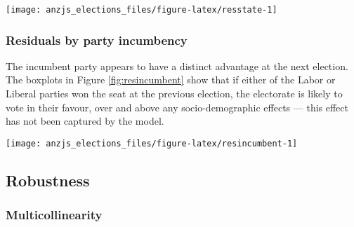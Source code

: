 \documentclass[times, doublespace]{anzsauth}
\let\origfigure\figure
\let\endorigfigure\endfigure
\renewenvironment{figure}[1][2] {
    \expandafter\origfigure\expandafter[htbp]
} {
    \endorigfigure
}
\begin{document}
\begin{figure}[h]

{\centering \texttt{[image: anzjs\_elections\_files/figure-latex/resstate-1]} 

}

\caption{Boxplot of residuals by state with jittered points. States ordered by median residual. A state-specific bias present only in the smaller states appears to have not been captured by the model.}\label{fig:resstate}
\end{figure}

\hypertarget{residuals-by-party-incumbency}{%
\subsubsection*{Residuals by party incumbency}\label{residuals-by-party-incumbency}}

The incumbent party appears to have a distinct advantage at the next election. The boxplots in Figure \ref{fig:resincumbent} show that if either of the Labor or Liberal parties won the seat at the previous election, the electorate is likely to vote in their favour, over and above any socio-demographic effects --- this effect has not been captured by the model.

\begin{figure}[h]

{\centering \texttt{[image: anzjs\_elections\_files/figure-latex/resincumbent-1]} 

}

\caption{Boxplot of residuals for incumbent and non-incumbent parties each year. An incumbent advantage is evident and has not been captured by the model.}\label{fig:resincumbent}
\end{figure}

\hypertarget{robustness}{%
\subsection{Robustness}\label{robustness}}

\hypertarget{multicollinearity}{%
\subsubsection*{Multicollinearity}\label{multicollinearity}}
\end{document}
